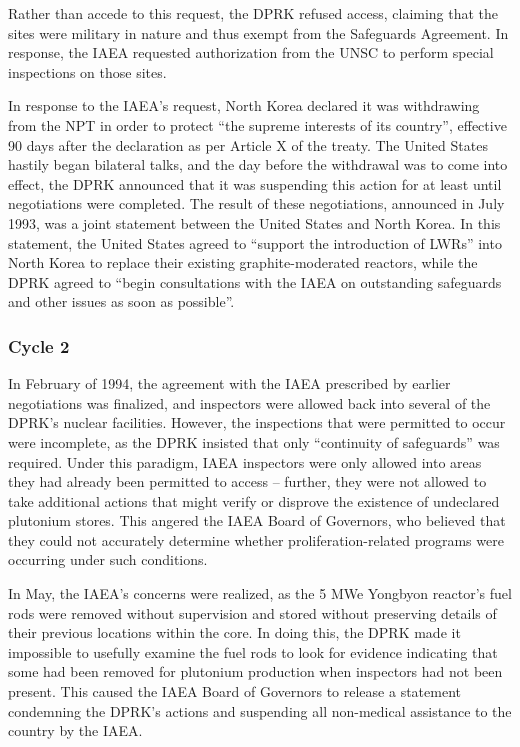 \documentclass{article}
\begin{document}
Rather than accede to this request, the DPRK refused access, claiming that the sites were military in nature and thus exempt from the Safeguards Agreement\cite{nti15,iaea09}. In response, the IAEA requested authorization from the UNSC to perform special inspections on those sites\cite{nti15}.
 
In response to the IAEA’s request, North Korea declared it was withdrawing from the NPT in order to protect “the supreme interests of its country”, effective 90 days after the declaration as per Article X of the treaty\cite{npt}. The United States hastily began bilateral talks, and the day before the withdrawal was to come into effect, the DPRK announced that it was suspending this action for at least until negotiations were completed\cite{nti15}. The result of these negotiations, announced in July 1993, was a joint statement between the United States and North Korea. In this statement, the United States agreed to “support the introduction of LWRs” into North Korea to replace their existing graphite-moderated reactors, while the DPRK agreed to “begin consultations with the IAEA on outstanding safeguards and other issues as soon as possible”\cite{hayes}. 

\subsubsection{Cycle 2}


In February of 1994, the agreement with the IAEA prescribed by earlier negotiations was finalized, and inspectors were allowed back into several of the DPRK’s nuclear facilities\cite{davenport}. However, the inspections that were permitted to occur were incomplete, as the DPRK insisted that only “continuity of safeguards” was required\cite{iaea09}. Under this paradigm, IAEA inspectors were only allowed into areas they had already been permitted to access – further, they were not allowed to take additional actions that might verify or disprove the existence of undeclared plutonium stores. This angered the IAEA Board of Governors, who believed that they could not accurately determine whether proliferation-related programs were occurring under such conditions\cite{davenport}.

In May, the IAEA’s concerns were realized, as the 5 MWe Yongbyon reactor’s fuel rods were removed without supervision and stored without preserving details of their previous locations within the core. In doing this, the DPRK made it impossible to usefully examine the fuel rods to look for evidence indicating that some had been removed for plutonium production when inspectors had not been present\cite{nobacksies}. This caused the IAEA Board of Governors to release a statement condemning the DPRK’s actions and suspending all non-medical assistance to the country by the IAEA\cite{iaea94}.
\end{document}
